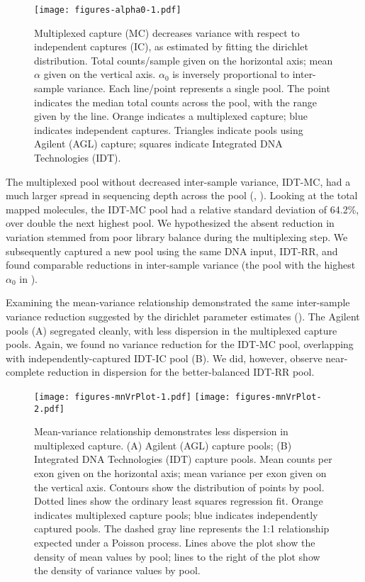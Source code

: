 \documentclass{article}\usepackage[]{graphicx}\usepackage[]{color}
\begin{document}
\begin{figure}
  \centering
  \texttt{[image: figures-alpha0-1.pdf]}
  \caption{Multiplexed capture (MC) decreases variance with respect to independent captures (IC), as estimated by fitting the dirichlet distribution. Total counts/sample given on the horizontal axis; mean $\alpha$ given on the vertical axis. $\alpha_0$ is inversely proportional to inter-sample variance. Each line/point represents a single pool. The point indicates the median total counts across the pool, with the range given by the line. Orange indicates a multiplexed capture; blue indicates independent captures. Triangles indicate pools using Agilent (AGL) capture; squares indicate Integrated DNA Technologies (IDT).}
  \label{fig:alpha0}
\end{figure}

The multiplexed pool without decreased inter-sample variance, IDT-MC, had a much larger spread in sequencing depth across the pool (, ).
Looking at the total mapped molecules, the IDT-MC pool had a relative standard deviation of 64.2\%, over double the next highest pool.
We hypothesized the absent reduction in variation stemmed from poor library balance during the multiplexing step.
We subsequently captured a new pool using the same DNA input, IDT-RR, and found comparable reductions in inter-sample variance (the pool with the highest $\alpha_0$ in ).

Examining the mean-variance relationship demonstrated the same inter-sample variance reduction suggested by the dirichlet parameter estimates ().
The Agilent pools (A) segregated cleanly, with less dispersion in the multiplexed capture pools.
Again, we found no variance reduction for the IDT-MC pool, overlapping with independently-captured IDT-IC pool (B).
We did, however, observe near-complete reduction in dispersion for the better-balanced IDT-RR pool.

\begin{figure}
  \centering
  \texttt{[image: figures-mnVrPlot-1.pdf]}%
  \texttt{[image: figures-mnVrPlot-2.pdf]}
  \caption{Mean-variance relationship demonstrates less dispersion in multiplexed capture. (A) Agilent (AGL) capture pools; (B) Integrated DNA Technologies (IDT) capture pools. Mean counts per exon given on the horizontal axis; mean variance per exon given on the vertical axis. Contours show the distribution of points by pool. Dotted lines show the ordinary least squares regression fit. Orange indicates multiplexed capture pools; blue indicates independently captured pools. The dashed gray line represents the 1:1 relationship expected under a Poisson process. Lines above the plot show the density of mean values by pool; lines to the right of the plot show the density of variance values by pool.}
  \label{fig:mnvr}
\end{figure}
\end{document}
